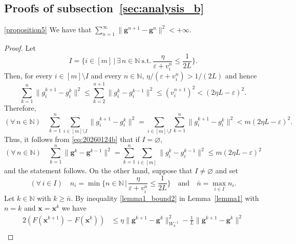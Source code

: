 \documentclass[11pt]{article}
\theoremstyle{plain}
\theoremstyle{definition}
\theoremstyle{remark}
\newcommand{\norm}[1]{\lVert{#1}\rVert}
\newcommand{\bx}{\bm{x}}
\newcommand{\buu}{\bm{g}}
\newcommand{\uu}{g}
\newcommand{\iter}{n}
\newcommand{\ite}{k}
\newcommand{\N}{\mathbb{N}}
\newcommand{\W}{W}
\begin{document}
\subsection{Proofs of subsection~\ref{sec:analysis_b}}

\begin{customprop}{\ref{proposition5}}
 We have that $\sum_{\iter=1}^\infty \lVert \buu^{\iter+1} - \buu^\iter \rVert^2<+\infty$.
\end{customprop}
\begin{proof}
Let 
\begin{equation}
I = \bigg\{ i\in [m]\,\Big\vert\, \exists\,\iter\in \N\ \text{s.t.}\ \frac{\eta}{\varepsilon+ v^\iter_i} \leq \frac{1}{2L}\bigg\}.
\end{equation}
Then, for every $i\in [m]\setminus I$ and every $n\in \N$, $\eta/(\varepsilon+ v^\iter_i)>1/(2L)$ and hence
\begin{equation*}
\sum_{\ite=1}^{\iter} \norm{\uu_i^{\ite+1} - \uu^{\ite}_i}^2 \leq 
\sum_{\ite=2}^{\iter+1} \norm{\uu_i^{\ite} - \uu^{\ite-1}_i}^2 \leq (v_i^{\iter+1})^2 < (2\eta L- \varepsilon)^2.
\end{equation*}
Therefore,
\begin{equation}
\label{eq:20260124b}
(\forall\,\iter\in \N)\quad
\sum_{\ite=1}^\iter \sum_{i\in [m]\setminus I} \norm{\uu_i^{\ite+1} - \uu^{\ite}_i}^2 =
\sum_{i\in [m]\setminus I}\sum_{\ite=1}^\iter \norm{\uu_i^{\ite+1} - \uu^{\ite}_i}^2 < m(2\eta L- \varepsilon)^2.
\end{equation}
Thus, it follows from \eqref{eq:20260124b} that if $I= \varnothing$,  
\begin{equation*}
(\forall\,\iter\in \N)\quad
\sum_{\ite=1}^\iter \norm{\buu^{\ite} - \buu^{\ite-1}}^2 = \sum_{\ite=1}^\iter \sum_{i\in [m]}
\norm{\uu_i^{\ite} - \uu^{\ite-1}_i}^2 \leq m(2\eta L- \varepsilon)^2
\end{equation*}
and the statement follows.
On the other hand, suppose that $I\neq\varnothing$ and set
\begin{equation*}
(\forall\,i\in I)\quad \iter_i = \min\bigg\{ \iter\in \N\,\Big\vert\, \frac{\eta}{\varepsilon+ v^\iter_i} \leq 
\frac{1}{2L}\bigg\}\quad\text{and}\quad \bar{\iter} = \max_{i\in I} \iter_i.
\end{equation*}
Let $\ite \in \N$ with $\ite\geq \bar{\iter}$.
By inequality \eqref{lemma1_bound2} in Lemma~\ref{lemma1} with $\iter=\ite$ and $\bx= \bx^{\ite}$ we have
\begin{align*}
    2(F(\bx^{\ite+1}) - F(\bx^\ite))  
    &\leq \eta \norm{\buu^{\ite+1} - \buu^{\ite}}_{\W_\ite^{-1}}^2 - \frac{1}{L}\norm{\buu^{\ite+1} - \buu^{\ite}}^2\\

\end{align*}
\end{proof}
\end{document}
